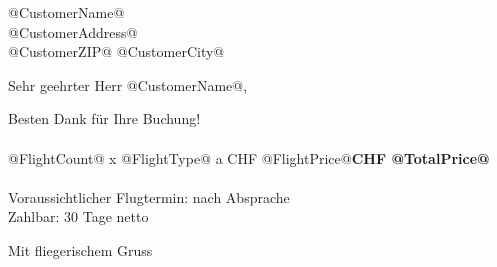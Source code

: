 \documentclass[RechnungTemplate]{scrlttr2}
\begin{document}
\begin{letter}
{@CustomerName@\\
@CustomerAddress@\\
@CustomerZIP@ @CustomerCity@
}
\opening{Sehr geehrter Herr @CustomerName@,}

Besten Dank für Ihre Buchung!\\
\\
@FlightCount@ x @FlightType@ a CHF @FlightPrice@\hfill \textbf{CHF @TotalPrice@}\\
\\
Voraussichtlicher Flugtermin: nach Absprache\\
Zahlbar: 30 Tage netto

\closing{Mit fliegerischem Gruss}
\end{letter}
\end{document}
